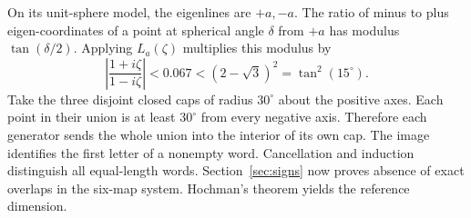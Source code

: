 On its unit-sphere model, the eigenlines are $+a,-a$. The ratio of minus to
plus eigen-coordinates of a point at spherical angle $\delta$ from $+a$ has
modulus $\tan(\delta/2)$. Applying $L_a(\zeta)$ multiplies this modulus by
\[
\left|\frac{1+i\zeta}{1-i\zeta}\right|<0.067
< (2-\sqrt3)^2=\tan^2(15^\circ).
\]
Take the three disjoint closed caps of radius $30^\circ$ about the positive
axes. Each point in their union is at least $30^\circ$ from every negative
axis. Therefore each generator sends the whole union into the interior of
its own cap. The image identifies the first letter of a nonempty word.
Cancellation and induction distinguish all equal-length words.
Section~\ref{sec:signs} now proves absence of exact overlaps in the six-map
system. Hochman's theorem yields the reference dimension.
